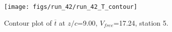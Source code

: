 \begin{figure}[H]
\centering
\texttt{[image: figs/run\_42/run\_42\_T\_contour]}
\caption{Contour plot of $\overline{t}$ at $z/c$=9.00, $V_{free}$=17.24, station 5.}
\label{fig:run_42_T_contour}
\end{figure}


